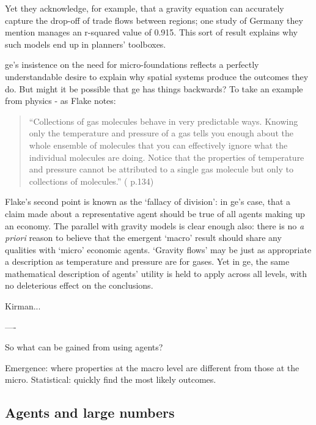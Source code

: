 Yet they acknowledge, for example, that a gravity equation can accurately capture the drop-off of trade flows between regions; one study of Germany they mention manages an r-squared value of 0.915. This sort of result explains why such models end up in planners' toolboxes. 

\gls{ge}'s insistence on the need for micro-foundations reflects a perfectly understandable desire to explain why spatial systems produce the outcomes they do. But might it be possible that \gls{ge} has things backwards? To take an example from physics - as Flake notes:

\begin{quote}
``Collections of gas molecules behave in very predictable ways. Knowing only the temperature and pressure of a gas tells you enough about the whole ensemble of molecules that you can effectively ignore what the individual molecules are doing. Notice that the properties of temperature and pressure cannot be attributed to a single gas molecule but only to collections of molecules.'' (\citealt{flake_computational_1998} p.134)
\end{quote}

Flake's second point is known as the `fallacy of division': in \gls{ge}'s case, that a claim made about a representative agent should be true of all agents making up an economy. The parallel with gravity models is clear enough also: there is no \emph{a priori} reason to believe that the emergent `macro' result should share any qualities with `micro' economic agents. `Gravity flows' may be just as appropriate a description as temperature and pressure are for gases. Yet in \gls{ge}, the same mathematical description of agents' utility is held to apply across all levels, with no deleterious effect on the conclusions.


Kirman...

----

So what can be gained from using agents? 

Emergence: where properties at the macro level are different from those at the micro.
Statistical: quickly find the most likely outcomes. 

\subsection{Agents and large numbers \label{numbers}}

